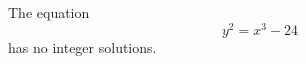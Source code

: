 \begin{proposition}
    The equation
\[
    y^2=x^3-24
\]
    has no integer solutions.
\end{proposition}

